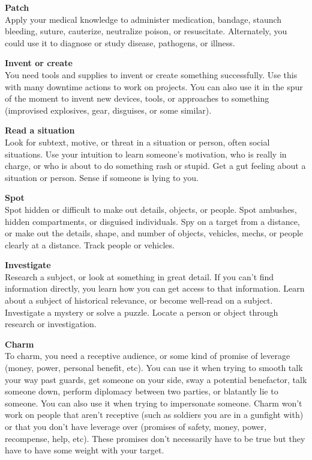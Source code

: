 \textbf{Patch}\\
Apply your medical knowledge to administer medication, bandage, staunch bleeding, suture, cauterize, neutralize poison, or resuscitate. Alternately, you could use it to diagnose or study disease, pathogens, or illness.

\textbf{Invent or create}\\
You need tools and supplies to invent or create something successfully. Use this with many downtime actions to work on projects. You can also use it in the spur of the moment to invent new devices, tools, or approaches to something (improvised explosives, gear, disguises, or some similar).

\textbf{Read a situation}\\ 
Look for subtext, motive, or threat in a situation or person, often social situations. Use your intuition to learn someone's motivation, who is really in charge, or who is about to do something rash or stupid. Get a gut feeling about a situation or person. Sense if someone is lying to you.

\textbf{Spot}\\
Spot hidden or difficult to make out details, objects, or people. Spot ambushes, hidden compartments, or disguised individuals. Spy on a target from a distance, or make out the details, shape, and number of objects, vehicles, mechs, or people clearly at a distance. Track people or vehicles.

\textbf{Investigate}\\
Research a subject, or look at something in great detail. If you can't find information directly, you learn how you can get access to that information. Learn about a subject of historical relevance, or become well-read on a subject. Investigate a mystery or solve a puzzle. Locate a person or object through research or investigation.

\textbf{Charm}\\
To charm, you need a receptive audience, or some kind of promise of leverage (money, power, personal benefit, etc). You can use it when trying to smooth talk your way past guards, get someone on your side, sway a potential benefactor, talk someone down, perform diplomacy between two parties, or blatantly lie to someone. You can also use it when trying to impersonate someone. Charm won't work on people that aren't receptive (such as soldiers you are in a gunfight with) or that you don't have leverage over (promises of safety, money, power, recompense, help, etc). These promises don't necessarily have to be true but they have to have some weight with your target.

